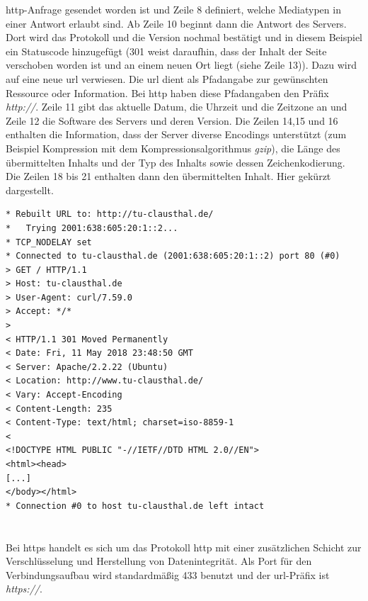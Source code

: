 \documentclass[titlepage]{report}
\begin{document}
\gls{http}\hyp{}Anfrage gesendet worden ist und Zeile 8 definiert,
welche Mediatypen in einer Antwort erlaubt sind\cite{RFC2616}. Ab Zeile
10 beginnt dann die Antwort des Servers. Dort wird das Protokoll und die
Version nochmal bestätigt und in diesem Beispiel ein Statuscode
hinzugefügt (301 weist daraufhin, dass der Inhalt der Seite verschoben
worden ist und an einem neuen Ort liegt (siehe Zeile 13)). Dazu wird auf
eine neue \gls{url} verwiesen. Die \gls{url} dient als Pfadangabe zur
gewünschten Ressource oder Information. Bei \gls{http} haben diese
Pfadangaben den Präfix \emph{http://}. Zeile 11 gibt
das aktuelle Datum, die Uhrzeit und die Zeitzone an und Zeile 12 die
Software des Servers und deren Version. Die Zeilen 14,15 und 16
enthalten die Information, dass der Server diverse Encodings unterstützt
(zum Beispiel Kompression mit dem Kompressionsalgorithmus \emph{gzip}),
die Länge des übermittelten Inhalts und der Typ des Inhalts sowie dessen
Zeichenkodierung. Die Zeilen 18 bis 21 enthalten dann den übermittelten
Inhalt. Hier gekürzt dargestellt.
\begin{lstlisting}[caption={Eine HTTP-Anfrage an
http://tu-clausthal.de},label={lst:1}]
* Rebuilt URL to: http://tu-clausthal.de/
*   Trying 2001:638:605:20:1::2...
* TCP_NODELAY set
* Connected to tu-clausthal.de (2001:638:605:20:1::2) port 80 (#0)
> GET / HTTP/1.1
> Host: tu-clausthal.de
> User-Agent: curl/7.59.0
> Accept: */*
>
< HTTP/1.1 301 Moved Permanently
< Date: Fri, 11 May 2018 23:48:50 GMT
< Server: Apache/2.2.22 (Ubuntu)
< Location: http://www.tu-clausthal.de/
< Vary: Accept-Encoding
< Content-Length: 235
< Content-Type: text/html; charset=iso-8859-1
<
<!DOCTYPE HTML PUBLIC "-//IETF//DTD HTML 2.0//EN">
<html><head>
[...]
</body></html>
* Connection #0 to host tu-clausthal.de left intact
\end{lstlisting}
\section*{}
Bei \gls{https} handelt es sich um das Protokoll \gls{http} mit einer
zusätzlichen Schicht zur Verschlüsselung und Herstellung von
Datenintegrität. Als Port für den Verbindungsaufbau wird standardmäßig
433 benutzt\cite[Siehe Section 2.3]{RFC2818} und der
\gls{url}\hyp{}Präfix ist \emph{https://}.
\section*{}
\end{document}

